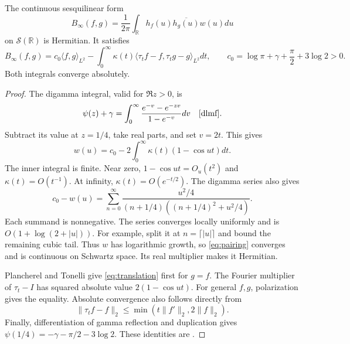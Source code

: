 \documentclass[11pt]{article}
\begin{document}
\begin{theorem}\label{thm:translation}
The continuous sesquilinear form
\begin{equation}\label{eq:pairing}
 B_\infty(f,g)=\frac1{2\pi}\int_{\mathbb R}
        h_f(u)\overline{h_g(u)}w(u)du
\end{equation}
on $\mathcal S(\mathbb R)$ is Hermitian. It satisfies
\begin{equation}\label{eq:translation}
 B_\infty(f,g)=c_0\langle f,g\rangle_{L^2}
 -\int_0^\infty\kappa(t)
       \langle\tau_t f-f,\tau_t g-g\rangle_{L^2}dt,
 \qquad
 c_0=\log\pi+\gamma+\frac\pi2+3\log2>0.
\end{equation}
Both integrals converge absolutely.
\end{theorem}
\begin{proof}
The digamma integral, valid for $\Re z>0$, is
\[
 \psi(z)+\gamma=\int_0^\infty
           \frac{e^{-v}-e^{-zv}}{1-e^{-v}}dv
 \quad\text{\cite[Eq.~5.9.16]{dlmf}}.
\]
Subtract its value at $z=1/4$, take real parts, and set $v=2t$.
This gives
\begin{equation}\label{eq:multiplier}
 w(u)=c_0-2\int_0^\infty\kappa(t)(1-\cos ut)dt.
\end{equation}
The inner integral is finite. Near zero, $1-\cos ut=O_u(t^2)$ and
$\kappa(t)=O(t^{-1})$. At infinity, $\kappa(t)=O(e^{-t/2})$.
The digamma series also gives
\begin{equation}\label{eq:positive-series}
 c_0-w(u)=\sum_{n=0}^\infty
 \frac{u^2/4}{(n+1/4)((n+1/4)^2+u^2/4)}.
\end{equation}
Each summand is nonnegative.
The series converges locally uniformly and is $O(1+\log(2+|u|))$.
For example, split it at $n=\lceil|u|\rceil$ and bound the remaining cubic tail.
Thus $w$ has logarithmic growth, so \eqref{eq:pairing} converges and is continuous on Schwartz space.
Its real multiplier makes it Hermitian.

Plancherel and Tonelli give \eqref{eq:translation} first for $g=f$.
The Fourier multiplier of $\tau_t-I$ has squared absolute value $2(1-\cos ut)$.
For general $f,g$, polarization gives the equality.
Absolute convergence also follows directly from
\[
 \|\tau_t f-f\|_2\le\min(t\|f'\|_2,2\|f\|_2).
\]
Finally, differentiation of gamma reflection and duplication gives
$\psi(1/4)=-\gamma-\pi/2-3\log2$.
These identities are \cite[Eqs.~5.5.4, 5.5.8]{dlmf}.
\end{proof}
\end{document}
